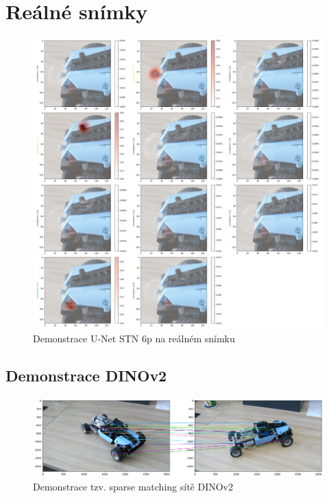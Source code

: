 \section{Reálné snímky}
\label{sec:Chapter64}

\begin{figure}[ht]
\centering
\includegraphics[width=1.0\textwidth,keepaspectratio]{Figures/real/real_3.png}
\caption[Demonstrace U-Net STN 6p na reálném snímku]{Demonstrace U-Net STN 6p na reálném snímku}
\label{fig:real_0}
\end{figure}

\subsection{Demonstrace DINOv2}

\begin{figure}[H]
\centering
\includegraphics[width=1.0\textwidth,keepaspectratio]{Figures/dinov2demo.png}
\caption[Demonstrace tzv. sparse matching sítě DINOv2]{Demonstrace tzv. sparse matching sítě DINOv2}
\label{fig:nets_false_detections}
\end{figure}
\endinput